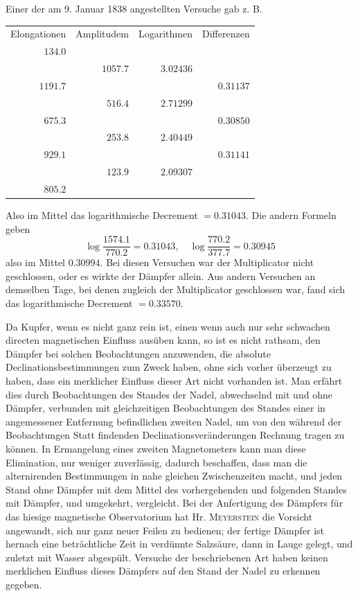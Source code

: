Einer der am 9. Januar 1838 angestellten Versuche gab z. B.
\begin{center}
\begin{tabular}{r|r|r|r}
Elongationen&Amplitudem&Logarithmen&Differenzen\\
$134.0$&&&\\[-3pt]
&$1057.7$&$3.02436$&\\[-3pt]
$1191.7$&&&$0.31137$\\[-3pt]
&$516.4$&$2.71299$&\\[-3pt]
$675.3$&&&$0.30850$\\[-3pt]
&$253.8$&$2.40449$&\\[-3pt]
$929.1$&&&$0.31141$\\[-3pt]
&$123.9$&$2.09307$&\\[-3pt]
$805.2$&&&
\end{tabular}
\end{center}
\GaussVSourceGathering{49\textsuperscript{*}}
\par\clearpage
{}
\noindent Also im Mittel das logarithmische Decrement $=0.31043$. Die andern Formeln geben
\[
\log\frac{1574.1}{770.2}=0.31043,\quad \log\frac{770.2}{377.7}=0.30945
\]
also im Mittel $0.30994$. Bei diesen Versuchen war der Multiplicator nicht geschlossen, oder es wirkte der Dämpfer allein. Aus andern Versuchen an demselben Tage, bei denen zugleich der Multiplicator geschlossen war, fand sich das logarithmische Decrement $=0.33570$.

Da Kupfer, wenn es nicht ganz rein ist, einen wenn auch nur sehr schwachen directen magnetischen Einfluss ausüben kann, so ist es nicht rathsam, den Dämpfer bei solchen Beobachtungen anzuwenden, die absolute Declinationsbestimmungen zum Zweck haben, ohne sich vorher überzeugt zu haben, dass ein merklicher Einfluss dieser Art nicht vorhanden ist. Man erfährt dies durch Beobachtungen des Standes der Nadel, abwechselnd mit und ohne Dämpfer, verbunden mit gleichzeitigen Beobachtungen des Standes einer in angemessener Entfernung befindlichen zweiten Nadel, um von den während der Beobachtungen Statt findenden Declinationsveränderungen Rechnung tragen zu können. In Ermangelung eines zweiten Magnetometers kann man diese Elimination, nur weniger zuverlässig, dadurch beschaffen, dass man die alternirenden Bestimmungen in nahe gleichen Zwischenzeiten macht, und jeden Stand ohne Dämpfer mit dem Mittel des vorhergehenden und folgenden Standes mit Dämpfer, und umgekehrt, vergleicht. Bei der Anfertigung des Dämpfers für das hiesige magnetische Observatorium hat Hr. \textsc{Meyerstein} die Vorsicht angewandt, sich nur ganz neuer Feilen zu bedienen; der fertige Dämpfer ist hernach eine beträchtliche Zeit in verdünnte Salzsäure, dann in Lauge gelegt, und zuletzt mit Wasser abgespült. Versuche der beschriebenen Art haben keinen merklichen Einfluss dieses Dämpfers auf den Stand der Nadel zu erkennen gegeben.

